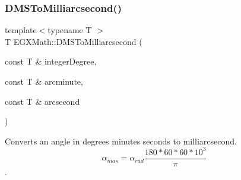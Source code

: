 \mbox{\label{group___e_g_x_math-_angle_conversions-_d_m_s_ga35a14699b2497a473f6a742ea2901557}} 
\subsubsection{\texorpdfstring{D\+M\+S\+To\+Milliarcsecond()}{DMSToMilliarcsecond()}}
{\footnotesize\ttfamily template$<$typename T $>$ \\
T E\+G\+X\+Math\+::\+D\+M\+S\+To\+Milliarcsecond (\begin{DoxyParamCaption}\item[{const T \&}]{integer\+Degree,  }\item[{const T \&}]{arcminute,  }\item[{const T \&}]{arcsecond }\end{DoxyParamCaption})}



Converts an angle in degrees minutes seconds to milliarcsecond. \[\alpha_{mas}=\alpha_{rad}\frac{180 * 60 * 60 * 10^3}{\pi}\]. 

